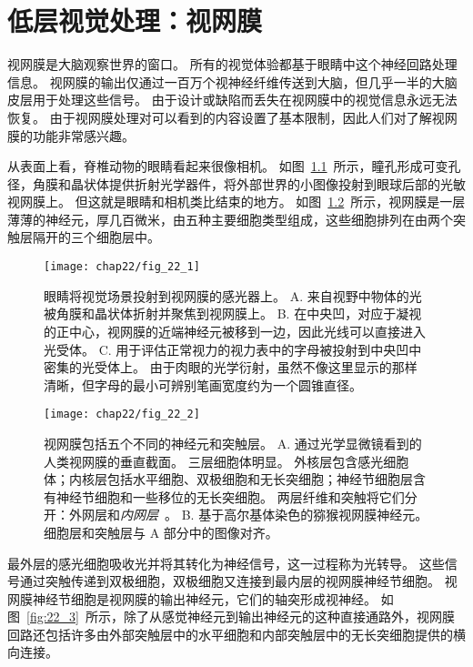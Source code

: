 \chapter{低层视觉处理：视网膜} \label{chap:chap22}

视网膜是大脑观察世界的窗口。
所有的视觉体验都基于眼睛中这个神经回路处理信息。 
视网膜的输出仅通过一百万个视神经纤维传送到大脑，但几乎一半的大脑皮层用于处理这些信号。
由于设计或缺陷而丢失在视网膜中的视觉信息永远无法恢复。
由于视网膜处理对可以看到的内容设置了基本限制，因此人们对了解视网膜的功能非常感兴趣。


从表面上看，脊椎动物的眼睛看起来很像相机。
如图~\ref{fig:22_1}~所示，瞳孔形成可变孔径，角膜和晶状体提供折射光学器件，将外部世界的小图像投射到眼球后部的光敏视网膜上。
但这就是眼睛和相机类比结束的地方。
如图~\ref{fig:22_2}~所示，视网膜是一层薄薄的神经元，厚几百微米，由五种主要细胞类型组成，这些细胞排列在由两个突触层隔开的三个细胞层中。


\begin{figure}[htbp]
	\centering
	\texttt{[image: chap22/fig\_22\_1]}
	\caption{眼睛将视觉场景投射到视网膜的感光器上。
		A. 来自视野中物体的光被角膜和晶状体折射并聚焦到视网膜上。
		B. 在中央凹，对应于凝视的正中心，视网膜的近端神经元被移到一边，因此光线可以直接进入光受体。
		C. 用于评估正常视力的视力表中的字母被投射到中央凹中密集的光受体上。
		由于肉眼的光学衍射，虽然不像这里显示的那样清晰，但字母的最小可辨别笔画宽度约为一个圆锥直径\cite{curcio1991organization}。}
	\label{fig:22_1}
\end{figure}


\begin{figure}[htbp]
	\centering
	\texttt{[image: chap22/fig\_22\_2]}
	\caption{视网膜包括五个不同的神经元和突触层。
		A. 通过光学显微镜看到的人类视网膜的垂直截面。
		三层细胞体明显。
		外核层包含感光细胞体；内核层包括水平细胞、双极细胞和无长突细胞；神经节细胞层含有神经节细胞和一些移位的无长突细胞。
		两层纤维和突触将它们分开：外网层和\textit{内网层}~\cite{boycott1969organization}。
		B. 基于高尔基体染色的猕猴视网膜神经元。
		细胞层和突触层与 A 部分中的图像对齐\cite{polyak1941retina}。}
	\label{fig:22_2}
\end{figure}


最外层的感光细胞吸收光并将其转化为神经信号，这一过程称为光转导。
这些信号通过突触传递到双极细胞，双极细胞又连接到最内层的视网膜神经节细胞。
视网膜神经节细胞是视网膜的输出神经元，它们的轴突形成视神经。
如图~\ref{fig:22_3}~所示，除了从感觉神经元到输出神经元的这种直接通路外，视网膜回路还包括许多由外部突触层中的水平细胞和内部突触层中的无长突细胞提供的横向连接。


